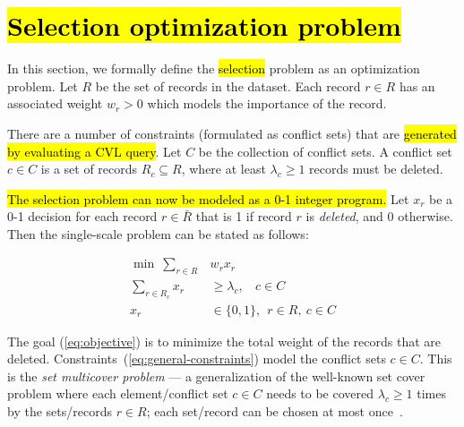 \section{\hl{Selection optimization problem}}
\label{sec:optimizationmodel}

In this section, we formally define the \hl{selection} problem as an optimization problem. Let $R$ be the set of records in the dataset. Each record $r \in R$ has an associated weight $w_r > 0$ which models the importance of the record. 

There are a number of constraints (formulated as conflict sets) that are \hl{generated by evaluating a CVL query}. Let $C$ be the collection of conflict sets. A conflict set $c \in C$ is a set of records $R_c \subseteq R$, where at least $\lambda_c \geq 1$ records must be deleted. 

\hl{The selection problem can now be modeled as a 0-1 integer program.} Let $x_r$ be a 0-1 decision for each record $r \in \bar{R}$ that is 1 if record $r$ is \emph{deleted}, and 0 otherwise. Then the single-scale problem can be stated as follows:

\begin{align}
  \label{eq:objective}
  \min ~\sum_{r \in R} &w_r x_r \\
  \label{eq:general-constraints}
  \sum_{r \in R_c} x_r &\geq \lambda_c, ~~~~ c \in C \\
  x_r & \in \{0, 1\}, ~~ r \in R, ~c \in C
\end{align}

The goal (\ref{eq:objective}) is to minimize the total weight of the records that are deleted. Constraints~(\ref{eq:general-constraints}) model the conflict sets $c \in C$. This is the \emph{set multicover problem} --- a generalization of the well-known set cover problem where each element/conflict set $c \in C$ needs to be covered $\lambda_c \geq 1$ times by the sets/records $r \in R$; each set/record can be chosen at most once~\cite{rajagopalan1998primal}.

